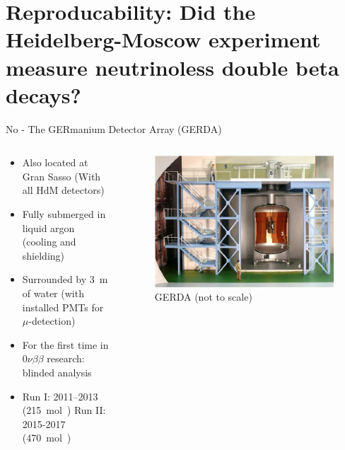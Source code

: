 \section{Reproducability: Did the Heidelberg-Moscow experiment measure neutrinoless double beta decays?}
\begin{frame}{No - The GERmanium Detector Array (GERDA)}
	\begin{columns}
		\begin{column}{.7\textwidth}
			\begin{itemize}
				\item Also located at Gran Sasso (With all HdM detectors)
				\item Fully submerged in liquid argon (cooling and shielding)
				\item Surrounded by \SI{3}{\meter} of water (with installed PMTs for $\mu$-detection)
				\item For the first time in $0\nu\beta\beta$ research: blinded analysis
				\item Run I: 2011--2013 (\SI{215}{\mole\year}) Run II: 2015-2017 (\SI{470}{\mole\year})
			\end{itemize}
		\end{column}
		\begin{column}{.29\textwidth}
			\begin{figure}
				\centering
				\includegraphics[trim=230 0 0 0,clip,width=\textwidth]{media/GERDA.png}
				\caption*{\hspace{-25em}GERDA (not to scale) \footnotemark[1]}
			\end{figure}
		\end{column}
	\end{columns}
\end{frame}
